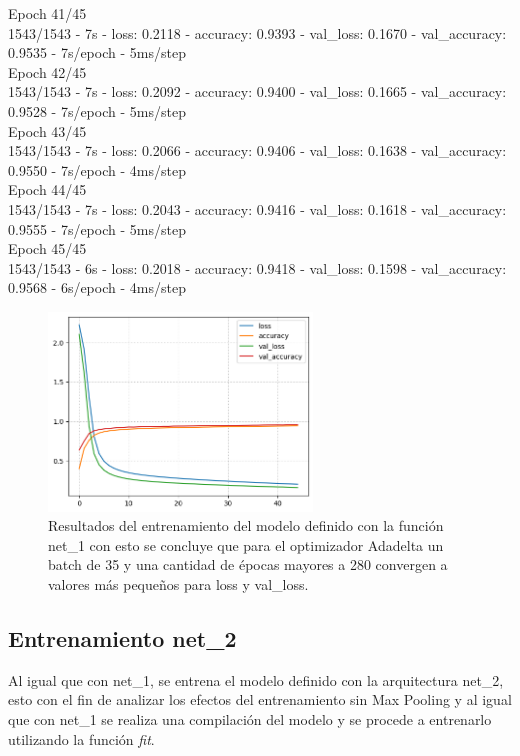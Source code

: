 \documentclass[journal]{IEEEtai}
\begin{document}
\hfill\break
Epoch 41/45\\
1543/1543 - 7s - loss: 0.2118 - accuracy: 0.9393 - val\_loss: 0.1670 - val\_accuracy: 0.9535 - 7s/epoch - 5ms/step\\
Epoch 42/45\\
1543/1543 - 7s - loss: 0.2092 - accuracy: 0.9400 - val\_loss: 0.1665 - val\_accuracy: 0.9528 - 7s/epoch - 5ms/step\\
Epoch 43/45\\
1543/1543 - 7s - loss: 0.2066 - accuracy: 0.9406 - val\_loss: 0.1638 - val\_accuracy: 0.9550 - 7s/epoch - 4ms/step\\
Epoch 44/45\\
1543/1543 - 7s - loss: 0.2043 - accuracy: 0.9416 - val\_loss: 0.1618 - val\_accuracy: 0.9555 - 7s/epoch - 5ms/step\\
Epoch 45/45\\
1543/1543 - 6s - loss: 0.2018 - accuracy: 0.9418 - val\_loss: 0.1598 - val\_accuracy: 0.9568 - 6s/epoch - 4ms/step\\

\begin{figure}[h!]
\centering
\includegraphics[width=7cm]{img/definiryentrenar1.png}
\caption{Resultados del entrenamiento del modelo definido con la función net\_1 con esto se concluye que para el optimizador Adadelta un batch de 35 y una cantidad de épocas mayores a 280 convergen a valores más pequeños para loss y val\_loss.}
\label{fig: definiryentrenar1}
\end{figure}

\subsection{Entrenamiento net\_2}

Al igual que con net\_1, se entrena el modelo definido con la arquitectura net\_2, esto con el fin de analizar los efectos del entrenamiento sin Max Pooling y al igual que con net\_1 se realiza una compilación del modelo y se procede a entrenarlo utilizando la función \textit{fit}. 
\end{document}
